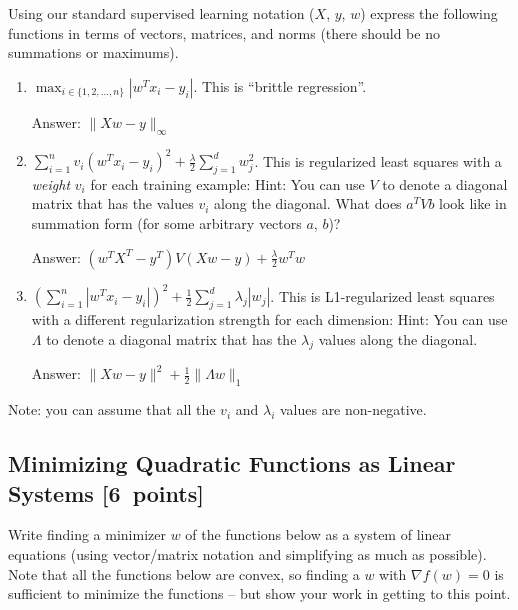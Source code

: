 \documentclass{article}
\newcommand{\blu}[1]{{\textcolor{blu}{#1}}}
\newenvironment{answer}{\par\begingroup\color{gre}Answer: }{\endgroup}
\let\ask\blu
\newcommand\pts[1]{\textcolor{pointscolour}{[#1~points]}}
\newcommand{\norm}[1]{\lVert #1 \rVert}
\begin{document}
Using our standard supervised learning notation ($X$, $y$, $w$)
\ask{express the following functions in terms of vectors, matrices, and norms} (there should be no summations or maximums).
\begin{enumerate}
\item $\max_{i \in \{1,2,\dots,n\}}  |w^Tx_i - y_i|$. This is ``brittle regression''.
    \begin{answer}
        $\norm{Xw-y}_\infty$
    \end{answer}
%
\item $\sum_{i=1}^n v_i(w^Tx_i  - y_i)^2 + \frac{\lambda}{2}\sum_{j=1}^d w_j^2$. This is regularized least squares with a \emph{weight} $v_i$ for each training example:  Hint: You can use $V$ to denote a diagonal matrix that has the values $v_i$ along the diagonal. What does $a^T V b$ look like in summation form (for some arbitrary vectors $a$, $b$)?
    \begin{answer}
        $(w^TX^T-y^T)V(Xw-y) + \frac{\lambda}{2} w^Tw$
    \end{answer}
%
\item $\left(\sum_{i=1}^n |w^Tx_i - y_i|\right)^2 +  \frac12 \sum_{j=1}^{d} \lambda_j|w_j|$. This is L1-regularized least squares with a different regularization strength for each dimension: Hint: You can use  $\Lambda$ to denote a diagonal matrix that has the $\lambda_j$ values along the diagonal.
    \begin{answer}
        $\norm{Xw - y}^2 + \frac{1}{2} \norm{\Lambda w}_1$
    \end{answer}
%
\end{enumerate}

Note: you can assume that all the $v_i$ and $\lambda_i$ values are non-negative.

\subsection{Minimizing Quadratic Functions as Linear Systems \pts{6}} \label{sec:lin-sys}

\ask{Write finding a minimizer $w$ of the functions below as a system of linear equations} (using vector/matrix notation and simplifying as much as possible). Note that all the functions below are convex, so finding a $w$ with $\nabla f(w) = 0$ is sufficient to minimize the functions -- but show your work in getting to this point.
\end{document}
